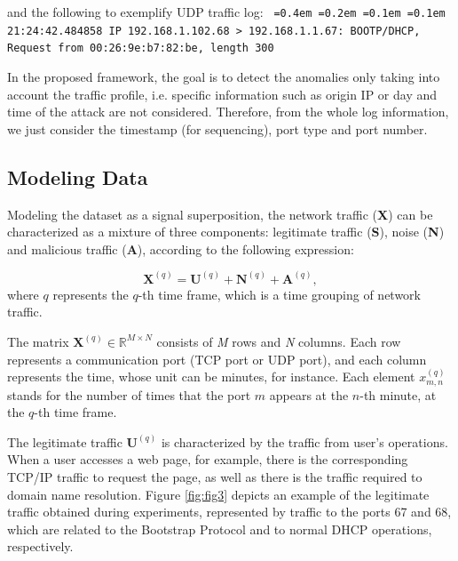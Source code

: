 \documentclass{bmcart}
\newcommand*\justify{%
	\fontdimen2\font=0.4em%
	\fontdimen3\font=0.2em%
	\fontdimen4\font=0.1em%
	\fontdimen7\font=0.1em%
}
\begin{document}
and the following to exemplify UDP traffic log: 
\newline
\newline
\texttt{\justify21:24:42.484858 IP 192.168.1.102.68 > 192.168.1.1.67: BOOTP/DHCP, Request from 00:26:9e:b7:82:be, length 300}
\newline 

In the proposed framework, the goal is to detect the anomalies only taking into account the traffic profile, i.e. specific information such as origin IP or day and time of the attack are not considered. Therefore, from the whole log information, we just consider the timestamp (for sequencing), port type and port number.

\subsection{Modeling Data}
\label{sec:ModelingData}

Modeling the dataset as a signal superposition, the network traffic (\textbf{X}) can be characterized as a mixture of three components: legitimate traffic (\textbf{S}), noise (\textbf{N}) and malicious traffic (\textbf{A}), according to the following expression:

\begin{equation}\label{eq:eq01}
\boldsymbol{X}^{(q)} = \boldsymbol{U}^{(q)} + \boldsymbol{N}^{(q)} + \boldsymbol{A}^{(q)},
\end{equation}
where $q$ represents the $q$-th time frame, which is a time grouping of network traffic.

The matrix $\boldsymbol{X}^{(q)} \in \mathbb{R}^{M \times N}$ consists of \emph{M} rows and \emph{N} columns. Each row represents a communication port (TCP port or UDP port), and each column represents the time, whose unit can be minutes, for instance. Each element $x_{m,n}^{(q)}$ stands for the number of times that the port $m$ appears at the $n$-th minute, at the $q$-th time frame.

The legitimate traffic $\boldsymbol{U}^{(q)}$ is characterized by the traffic from user's operations. When a user accesses a web page, for example, there is the corresponding TCP/IP traffic to request the page, as well as there is the traffic required to domain name resolution. Figure \ref{fig:fig3} depicts an example of the legitimate traffic obtained during experiments, represented by traffic to the ports 67 and 68, which are related to the Bootstrap Protocol and to normal DHCP operations, respectively.
\end{document}
